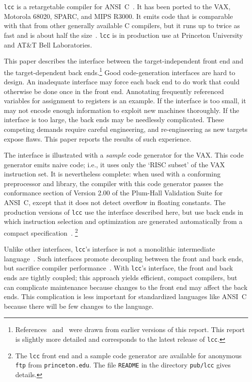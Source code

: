 \verb|lcc| is a retargetable compiler for ANSI~C~\cite{ansi:Cstandard}.
It has been ported to the VAX, Motorola 68020, SPARC, and MIPS R3000.
It emits code that is comparable with that from other generally
available C compilers, but it runs up to twice as fast and is about
half the size~\cite{fraser:hanson:91b}.
\verb|lcc| is in production use at Princeton University
and AT\&T Bell Laboratories.

This paper describes the interface between the target-independent
front end and the target-dependent back ends.\footnote{References~\cite{fraser:hanson:91a}
and~\cite{fraser:hanson:92} were drawn from earlier versions of this report.
This report is slightly more detailed and corresponds to the latest
release of \verb|lcc|.}
Good code-generation interfaces are hard to design.
An inadequate interface may force each back end
to do work that could otherwise be done once in the front end.
Annotating frequently referenced variables for assignment
to registers is an example.
If the interface is too small, it
may not encode enough information to exploit new
machines thoroughly.  If the interface is too large, the back ends
may be needlessly complicated.
These competing demands
require careful engineering, and re-engineering as new targets expose
flaws. This paper reports the results of such experience.

The interface is illustrated with a {\em sample} code generator
for the VAX.  This code generator emits naive code; i.e., it uses only
the `RISC subset' of the VAX instruction set.  It is nevertheless
complete:  when used with a conforming preprocessor and library, the
compiler with this code generator passes the conformance section of
Version 2.00 of the Plum-Hall Validation Suite for ANSI~C, except that
it does not detect overflow in floating constants.
The production versions of \verb|lcc| use the interface described here,
but use back ends in which instruction selection and optimization are
generated automatically from a compact specification~\cite{fraser:sigplan89}.%
\footnote{The {\tt lcc} front end and a sample code generator are available
for anonymous {\tt ftp} from {\tt princeton.edu}.
The file {\tt README} in the directory {\tt pub/lcc} gives details.}

Unlike other interfaces, \verb|lcc|'s interface is not a monolithic
intermediate language~\cite{tanenbaum:toplas:82}. Such interfaces
promote decoupling between the front and back ends, but sacrifice
compiler performance~\cite{tanenbaum:sigplan:89}. With \verb|lcc|'s
interface, the front and back ends are tightly coupled; this approach
yields efficient, compact compilers, but can complicate maintenance
because changes to the front end may affect the back ends.  This
complication is less important for standardized languages like ANSI~C
because there will be few changes to the language.

